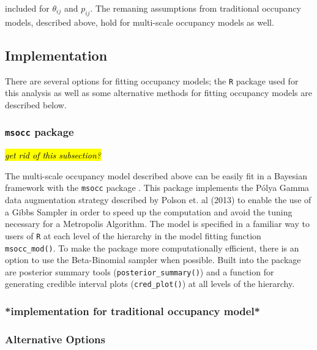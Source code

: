 \documentclass[12pt]{article}\usepackage[]{graphicx}\usepackage[]{color}
\begin{document}
included for $\theta_{ij}$ and $p_{ij}$. The remaning assumptions from traditional occupancy models, described above, hold for multi-scale occupancy models as well.  

\subsection{Implementation}

There are several options for fitting occupancy models; the \texttt{R} package used for this analysis as well as some alternative methods for fitting occupancy models are described below. 

\subsubsection{\texttt{msocc} package}

\hl{\textit{get rid of this subsection?}}

The multi-scale occupancy model described above \cite{Dorazio_Erickson} can be easily fit in a Bayesian framework with the \texttt{msocc} package \cite{Stratton}. This package implements the P\'{o}lya Gamma data augmentation strategy described by Polson et. al (2013) to enable the use of a Gibbs Sampler in order to speed up the computation and avoid the tuning necessary for a Metropolis Algorithm. The model is specified in a familiar way to users of \texttt{R} at each level of the hierarchy in the model fitting function \texttt{msocc\_mod()}. To make the package more computationally efficient, there is an option to use the Beta-Binomial sampler when possible. Built into the package are posterior summary tools (\texttt{posterior\_summary()}) and a function for generating credible interval plots (\texttt{cred\_plot()}) at all levels of the hierarchy. 

\subsubsection{*implementation for traditional occupancy model*}



\subsubsection{Alternative Options}
\end{document}
